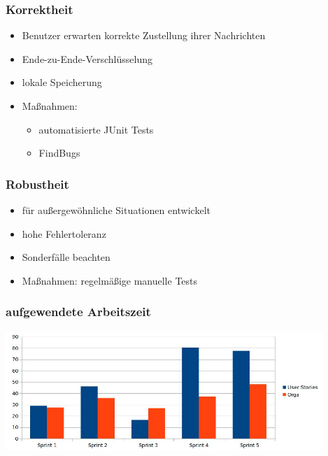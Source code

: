 \documentclass[accentcolor=tud2d,colorbacktitle]{tudbeamer}
\begin{document}
  \begin{frame}
    \frametitle{Korrektheit}
    \begin{itemize}
      \item Benutzer erwarten korrekte Zustellung ihrer Nachrichten
      \item Ende-zu-Ende-Verschlüsselung
      \item lokale Speicherung
    \end{itemize}
    \begin{itemize}
      \item Maßnahmen:
        \begin{itemize}
          \item automatisierte JUnit Tests
          \item FindBugs
        \end{itemize}
    \end{itemize}
  \end{frame}

  \begin{frame}
    \frametitle{Robustheit}
    \begin{itemize}
      \item für außergewöhnliche Situationen entwickelt
      \item hohe Fehlertoleranz
      \item Sonderfälle beachten
    \end{itemize}
    \begin{itemize}
      \item Maßnahmen: regelmäßige manuelle Tests
    \end{itemize}
  \end{frame}

  \begin{frame}
    \frametitle{aufgewendete Arbeitszeit}
    \begin{center}
      \includegraphics[height=4.5cm]{zeiten.jpg}
    \end{center}
  \end{frame}
\end{document}
